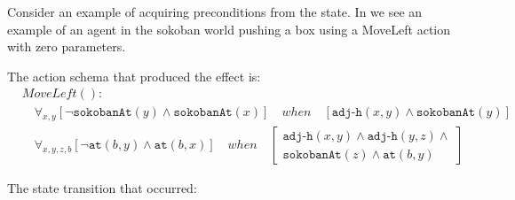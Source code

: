 \documentclass[\master/Master.tex]{subfiles}
\begin{document}
\begin{example}\label{ex:ca:sokoban-moveleft-action}
    Consider an example of acquiring preconditions from the state. In  we see an example of an agent in the sokoban world pushing a box using a MoveLeft action with zero parameters.

    The action schema that produced the effect is:
    \begin{align*}
    &MoveLeft():&  \\
    &\quad
        \forall_{x, y}
            \left[
                \neg\texttt{sokobanAt}(y) \land \texttt{sokobanAt}(x)
            \right]
            \quad when \quad
            \left[ \texttt{adj-h}(x,y) \land \texttt{sokobanAt}(y) \right]& \\
    &\quad
        \forall_{x, y, z, b}
            \left[ \neg\texttt{at}(b,y) \land \texttt{at}(b,x) \right]
            \quad when \quad
            \left[
                \begin{gathered}
                     \texttt{adj-h}(x,y) \land \texttt{adj-h}(y,z) \land \\
                          \texttt{sokobanAt}(z) \land \texttt{at}(b, y)
                \end{gathered}
            \right] &
    \end{align*}

    The state transition that occurred:


\end{example}
\end{document}
